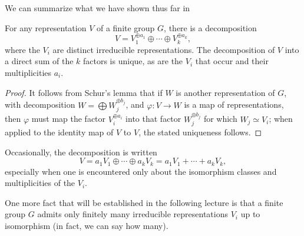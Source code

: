 We can summarize what we have shown thus far in
\begin{proposition}
  For any representation $V$ of a finite group $G$, there is a
  decomposition
  \[
    V=V_1^{\oplus a_1}\oplus\dotsb\oplus V_k^{\oplus a_k},
  \]
  where the $V_i$ are distinct irreducible representations. The
  decomposition of $V$ into a direct sum of the $k$ factors is unique, as
  are the $V_i$ that occur and their multiplicities $a_i$.
\end{proposition}
\begin{proof}
It follows from Schur's lemma that if $W$ is another representation of $G$,
with decomposition $W=\bigoplus W_j^{\oplus b_j}$, and $\varphi\colon V\to
W$ is a map of representations, then $\varphi$ must map the factor
$V_i^{\oplus a_i}$ into that factor $W_j^{\oplus b_j}$ for which $W_j\simeq
V_i$; when applied to the identity map of $V$ to $V$, the stated uniqueness
follows.
\end{proof}


Occasionally, the decomposition is written
\[
V=a_1V_1\oplus\dotsb\oplus a_kV_k=a_1V_1+\dotsb+a_kV_k,
\]
especially when one is encountered only about the isomorphism classes and
multiplicities of the $V_i$.

One more fact that will be established in the following lecture is that a
finite group $G$ admits only finitely many irreducible representations
$V_i$ up to isomorphism (in fact, we can say how many).

